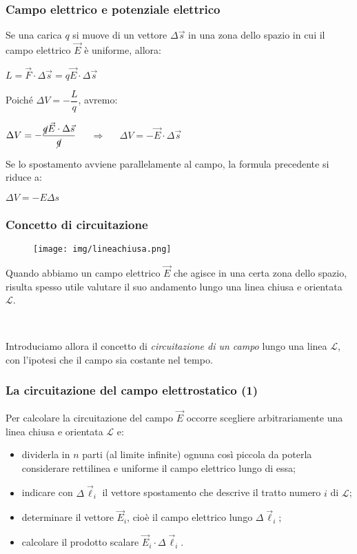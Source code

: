 \documentclass[handout]{beamer}
\theoremstyle{plain}
\begin{document}
\begin{frame}
\frametitle{Campo elettrico e potenziale elettrico}
Se una carica $ q $ si muove di un vettore $ \Delta \vec{s} $ in una zona dello spazio in cui il campo elettrico $ \vec{E} $ è uniforme, allora:
\begin{center}
$ L = \vec{F} \cdot \Delta \vec{s} = q\vec{E} \cdot \Delta \vec{s} $
\end{center}\pause
Poiché $ \Delta V = - \dfrac{L}{q} $, avremo:
\begin{center}
$ \Delta V = - \dfrac{\cancel{q}\vec{E} \cdot \Delta \vec{s}}{\cancel{q}} $ \pause$~~~~~ \Longrightarrow ~~~~~  $ \colorbox{blue!30}{$ \Delta V = - \vec{E} \cdot \Delta \vec{s} $} 
\end{center}\pause
Se lo spostamento avviene parallelamente al campo, la formula precedente si riduce a:
\begin{center}
\colorbox{blue!30}{$ \Delta V = - E \Delta s $} 
\end{center}
\end{frame}




\begin{frame}
\frametitle{Concetto di circuitazione}
\begin{figure}
\texttt{[image: img/lineachiusa.png]}
\end{figure}
Quando abbiamo un campo elettrico $ \vec{E} $ che agisce in una certa zona dello spazio, risulta spesso utile valutare il suo andamento lungo una linea chiusa e orientata $ \mathscr{L} $.\pause

~

Introduciamo allora il concetto di \emph{circuitazione di un campo} lungo una linea $ \mathscr{L} $, con l'ipotesi che il campo sia costante nel tempo.
\end{frame}







\begin{frame}
  \frametitle{La circuitazione del campo elettrostatico (1)}
  Per calcolare la circuitazione del campo $ \vec{E} $ occorre scegliere arbitrariamente una linea chiusa e orientata $ \mathscr{L} $ e:\pause
  \begin{itemize}
    \item dividerla in $ n $ parti (al limite infinite) ognuna così piccola da poterla considerare \alert<2>{rettilinea} e \alert<2>{uniforme} il campo elettrico lungo di essa;\pause
    \item indicare con $ \Delta \vec{\ell}_i $ il \alert<3>{vettore spostamento} che descrive il tratto numero $ i $ di $ \mathscr{L} $;\pause
    \item determinare il vettore $ \vec{E}_i $, cioè il \alert<4>{campo elettrico lungo $ \Delta \vec{\ell}_i $};\pause
    \item calcolare il \alert<5>{prodotto scalare} $ \vec{E}_i \cdot \Delta \vec{\ell}_i $.
  \end{itemize}
\end{frame}
\end{document}
